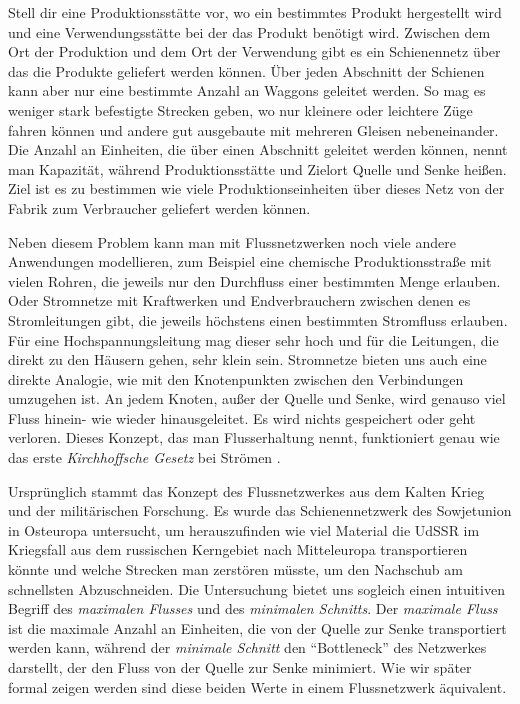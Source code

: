 Stell dir eine Produktionsstätte vor, wo ein bestimmtes Produkt hergestellt wird und eine Verwendungsstätte bei der das Produkt benötigt wird. Zwischen dem Ort der Produktion und dem Ort der Verwendung gibt es ein Schienennetz über das die Produkte geliefert werden können. Über jeden Abschnitt der Schienen kann aber nur eine bestimmte Anzahl an Waggons geleitet werden. So mag es weniger stark befestigte Strecken geben, wo nur kleinere oder leichtere Züge fahren können und andere gut ausgebaute mit mehreren Gleisen nebeneinander. Die Anzahl an Einheiten, die über einen Abschnitt geleitet werden können, nennt man Kapazität, während Produktionsstätte und Zielort Quelle und Senke heißen. Ziel ist es zu bestimmen wie viele Produktionseinheiten über dieses Netz von der Fabrik zum Verbraucher geliefert werden können.

Neben diesem Problem kann man mit Flussnetzwerken noch viele andere Anwendungen modellieren, zum Beispiel eine chemische Produktionsstraße mit vielen Rohren, die jeweils nur den Durchfluss einer bestimmten Menge erlauben. Oder Stromnetze mit Kraftwerken und Endverbrauchern zwischen denen es Stromleitungen gibt, die jeweils höchstens einen bestimmten Stromfluss erlauben. Für eine Hochspannungsleitung mag dieser sehr hoch und für die Leitungen, die direkt zu den Häusern gehen, sehr klein sein. Stromnetze bieten uns auch eine direkte Analogie, wie mit den Knotenpunkten zwischen den Verbindungen umzugehen ist. An jedem Knoten, außer der Quelle und Senke, wird genauso viel Fluss hinein- wie wieder hinausgeleitet. Es wird nichts gespeichert oder geht verloren. Dieses Konzept, das man Flusserhaltung nennt, funktioniert genau wie das erste \emph{Kirchhoffsche Gesetz} bei Strömen \citep{clrs09}. 

Ursprünglich stammt das Konzept des Flussnetzwerkes aus dem Kalten Krieg und der militärischen Forschung. Es wurde das Schienennetzwerk des Sowjetunion in Osteuropa untersucht, um herauszufinden wie viel Material die UdSSR im Kriegsfall aus dem russischen Kerngebiet nach Mitteleuropa transportieren könnte und welche Strecken man zerstören müsste, um den Nachschub am schnellsten Abzuschneiden. Die Untersuchung bietet uns sogleich einen intuitiven Begriff des \emph{maximalen Flusses} und des \emph{minimalen Schnitts}. Der \emph{maximale Fluss} ist die maximale Anzahl an Einheiten, die von der Quelle zur Senke transportiert werden kann, während der \emph{minimale Schnitt} den \enquote{Bottleneck} des Netzwerkes darstellt, der den Fluss von der Quelle zur Senke minimiert. Wie wir später formal zeigen werden sind diese beiden Werte in einem Flussnetzwerk äquivalent.

